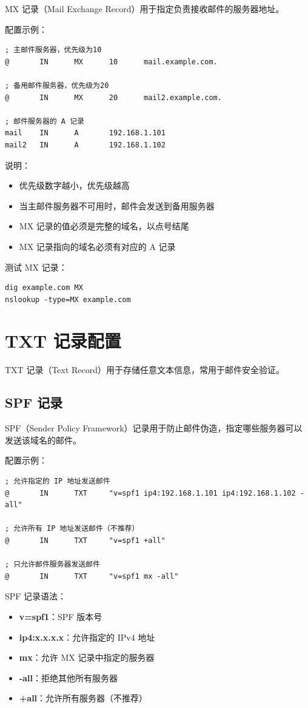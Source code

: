 \documentclass[12pt,UTF8]{ctexbook}
\begin{document}
MX 记录（Mail Exchange Record）用于指定负责接收邮件的服务器地址。

配置示例：
\begin{verbatim}
; 主邮件服务器，优先级为10
@       IN      MX      10      mail.example.com.

; 备用邮件服务器，优先级为20
@       IN      MX      20      mail2.example.com.

; 邮件服务器的 A 记录
mail    IN      A       192.168.1.101
mail2   IN      A       192.168.1.102
\end{verbatim}

说明：
\begin{itemize}
    \item 优先级数字越小，优先级越高
    \item 当主邮件服务器不可用时，邮件会发送到备用服务器
    \item MX 记录的值必须是完整的域名，以点号结尾
    \item MX 记录指向的域名必须有对应的 A 记录
\end{itemize}

测试 MX 记录：
\begin{verbatim}
dig example.com MX
nslookup -type=MX example.com
\end{verbatim}

\section{TXT 记录配置}
\label{sec:txt_record}

TXT 记录（Text Record）用于存储任意文本信息，常用于邮件安全验证。

\subsection{SPF 记录}

SPF（Sender Policy Framework）记录用于防止邮件伪造，指定哪些服务器可以发送该域名的邮件。

配置示例：
\begin{verbatim}
; 允许指定的 IP 地址发送邮件
@       IN      TXT     "v=spf1 ip4:192.168.1.101 ip4:192.168.1.102 -all"

; 允许所有 IP 地址发送邮件（不推荐）
@       IN      TXT     "v=spf1 +all"

; 只允许邮件服务器发送邮件
@       IN      TXT     "v=spf1 mx -all"
\end{verbatim}

SPF 记录语法：
\begin{itemize}
    \item \textbf{v=spf1}：SPF 版本号
    \item \textbf{ip4:x.x.x.x}：允许指定的 IPv4 地址
    \item \textbf{mx}：允许 MX 记录中指定的服务器
    \item \textbf{-all}：拒绝其他所有服务器
    \item \textbf{+all}：允许所有服务器（不推荐）
\end{itemize}
\end{document}
